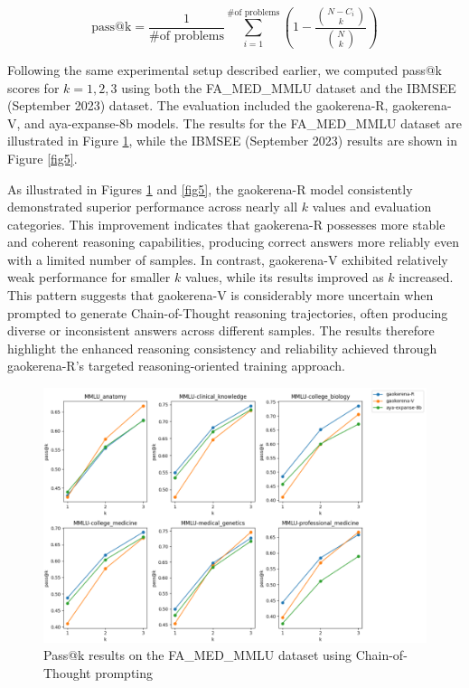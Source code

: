 \documentclass[conference]{IEEEtran}
\begin{document}
\begin{equation}
\text{pass@k} = \frac{1}{\text{\# of problems}} \sum_{i=1}^{\text{\# of problems}} \left( 1 -  \frac{\binom{N - C_i}{k}}{\binom{N}{k}} \right)
\label{fr:passatk}
\end{equation}

Following the same experimental setup described earlier, we computed pass@k scores for \(k = 1, 2, 3\) using both the FA\_MED\_MMLU dataset and the IBMSEE (September 2023) dataset. The evaluation included the gaokerena-R, gaokerena-V, and aya-expanse-8b models. The results for the FA\_MED\_MMLU dataset are illustrated in Figure
\ref{fig4}, while the IBMSEE (September 2023) results are shown in Figure
\ref{fig5}.

As illustrated in Figures
\ref{fig4} and
\ref{fig5}, the gaokerena-R model consistently demonstrated superior performance across nearly all \(k\) values and evaluation categories. This improvement indicates that gaokerena-R possesses more stable and coherent reasoning capabilities, producing correct answers more reliably even with a limited number of samples. In contrast, gaokerena-V exhibited relatively weak performance for smaller \(k\) values, while its results improved as \(k\) increased. This pattern suggests that gaokerena-V is considerably more uncertain when prompted to generate Chain-of-Thought reasoning trajectories, often producing diverse or inconsistent answers across different samples. The results therefore highlight the enhanced reasoning consistency and reliability achieved through gaokerena-R’s targeted reasoning-oriented training approach.


\begin{figure}[h]
    \centering
    \includegraphics[width=1.0\linewidth]{fig4.png}
    \caption{Pass@k results on the FA\_MED\_MMLU dataset using Chain-of-Thought prompting}
    \label{fig4}
\end{figure}
\end{document}
